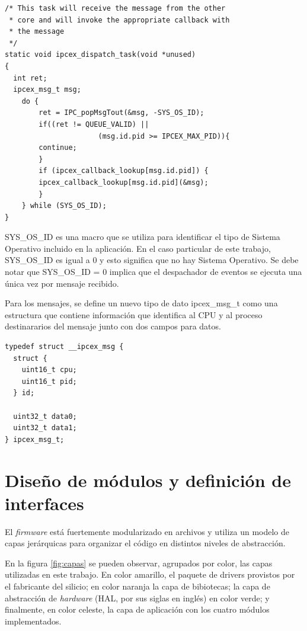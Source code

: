 \begin{verbatim}
/* This task will receive the message from the other 
 * core and will invoke the appropriate callback with
 * the message
 */
static void ipcex_dispatch_task(void *unused)
{
  int ret;
  ipcex_msg_t msg;
  	do {
    	ret = IPC_popMsgTout(&msg, -SYS_OS_ID);
    	if((ret != QUEUE_VALID) || 
                      (msg.id.pid >= IPCEX_MAX_PID)){
      	continue;
    	}
    	if (ipcex_callback_lookup[msg.id.pid]) {
      	ipcex_callback_lookup[msg.id.pid](&msg);
    	}
  	} while (SYS_OS_ID);
}
\end{verbatim}

SYS\_OS\_ID es una macro que se utiliza para identificar el tipo de Sistema Operativo incluido en la aplicación.  En el caso particular de este trabajo, SYS\_OS\_ID es igual a 0 y esto significa que no hay Sistema Operativo.  Se debe notar que SYS\_OS\_ID = 0 implica que el despachador de eventos se ejecuta una única vez por mensaje recibido.

Para los mensajes, se define un nuevo tipo de dato ipcex\_msg\_t como una estructura que contiene información que identifica al CPU y al proceso destinararios del mensaje junto con dos campos para datos.

\begin{verbatim}
typedef struct __ipcex_msg {
  struct {
    uint16_t cpu;
    uint16_t pid;
  } id;

  uint32_t data0;
  uint32_t data1;
} ipcex_msg_t;
\end{verbatim}

\section{Diseño de módulos y definición de interfaces}
\label{sec:modulos}

El \textit{firmware} está fuertemente modularizado en archivos y utiliza un modelo de capas jerárquicas para organizar el código en distintos niveles de abstracción.  

En la figura \ref{fig:capas} se pueden observar, agrupados por color, las capas utilizadas en este trabajo.  En color amarillo, el paquete de drivers provistos por el fabricante del silicio; en color naranja la capa de bibiotecas; la capa de abstracción de \textit{hardware} (HAL, por sus siglas en inglés) en color verde; y finalmente, en color celeste, la capa de aplicación con los cuatro módulos implementados.   


